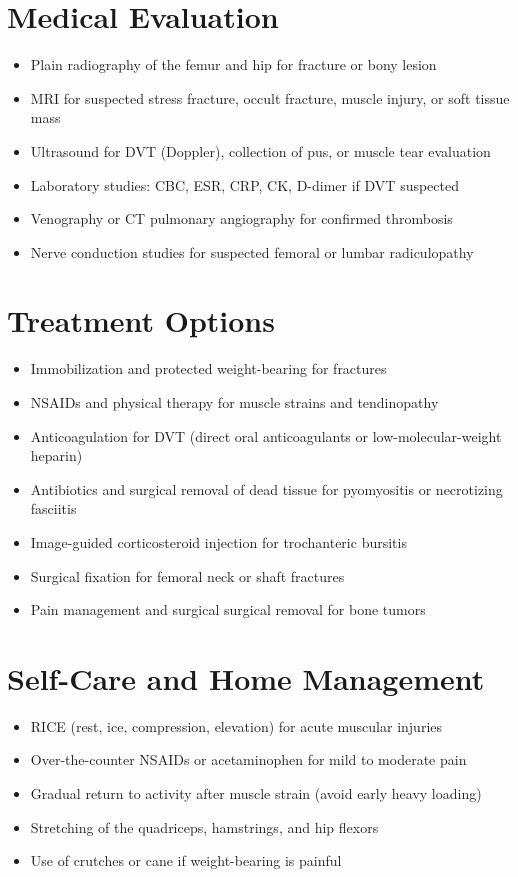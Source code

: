 \section*{Medical Evaluation}
\begin{itemize}
  \item Plain radiography of the femur and hip for fracture or bony lesion
  \item MRI for suspected stress fracture, occult fracture, muscle injury, or soft tissue mass
  \item Ultrasound for DVT (Doppler), collection of pus, or muscle tear evaluation
  \item Laboratory studies: CBC, ESR, CRP, CK, D-dimer if DVT suspected
  \item Venography or CT pulmonary angiography for confirmed thrombosis
  \item Nerve conduction studies for suspected femoral or lumbar radiculopathy
\end{itemize}

\section*{Treatment Options}
\begin{itemize}
  \item Immobilization and protected weight-bearing for fractures
  \item NSAIDs and physical therapy for muscle strains and tendinopathy
  \item Anticoagulation for DVT (direct oral anticoagulants or low-molecular-weight heparin)
  \item Antibiotics and surgical removal of dead tissue for pyomyositis or necrotizing fasciitis
  \item Image-guided corticosteroid injection for trochanteric bursitis
  \item Surgical fixation for femoral neck or shaft fractures
  \item Pain management and surgical surgical removal for bone tumors
\end{itemize}

\section*{Self-Care and Home Management}
\begin{itemize}
  \item RICE (rest, ice, compression, elevation) for acute muscular injuries
  \item Over-the-counter NSAIDs or acetaminophen for mild to moderate pain
  \item Gradual return to activity after muscle strain (avoid early heavy loading)
  \item Stretching of the quadriceps, hamstrings, and hip flexors
  \item Use of crutches or cane if weight-bearing is painful
\end{itemize}

